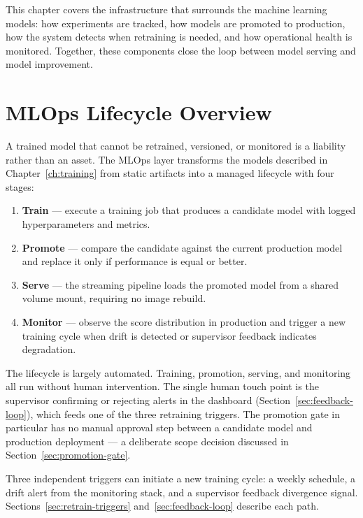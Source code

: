 This chapter covers the infrastructure that surrounds the machine learning
models: how experiments are tracked, how models are promoted to production,
how the system detects when retraining is needed, and how operational health
is monitored. Together, these components close the loop between model serving
and model improvement.

\section{MLOps Lifecycle Overview}
\label{sec:mlops-lifecycle}

A trained model that cannot be retrained, versioned, or monitored is a
liability rather than an asset. The MLOps layer transforms the models
described in Chapter~\ref{ch:training} from static artifacts into a managed
lifecycle with four stages:

\begin{enumerate}
    \item \textbf{Train} --- execute a training job that produces a candidate
          model with logged hyperparameters and metrics.
    \item \textbf{Promote} --- compare the candidate against the current
          production model and replace it only if performance is equal or
          better.
    \item \textbf{Serve} --- the streaming pipeline loads the promoted model
          from a shared volume mount, requiring no image rebuild.
    \item \textbf{Monitor} --- observe the score distribution in production
          and trigger a new training cycle when drift is detected or
          supervisor feedback indicates degradation.
\end{enumerate}

The lifecycle is largely automated. Training, promotion, serving, and
monitoring all run without human intervention. The single human touch point
is the supervisor confirming or rejecting alerts in the dashboard
(Section~\ref{sec:feedback-loop}), which feeds one of the three retraining
triggers. The promotion gate in particular has no manual approval step
between a candidate model and production deployment --- a deliberate scope
decision discussed in Section~\ref{sec:promotion-gate}.

Three independent triggers can initiate a new training cycle: a weekly
schedule, a drift alert from the monitoring stack, and a supervisor feedback
divergence signal. Sections~\ref{sec:retrain-triggers}
and~\ref{sec:feedback-loop} describe each path.


